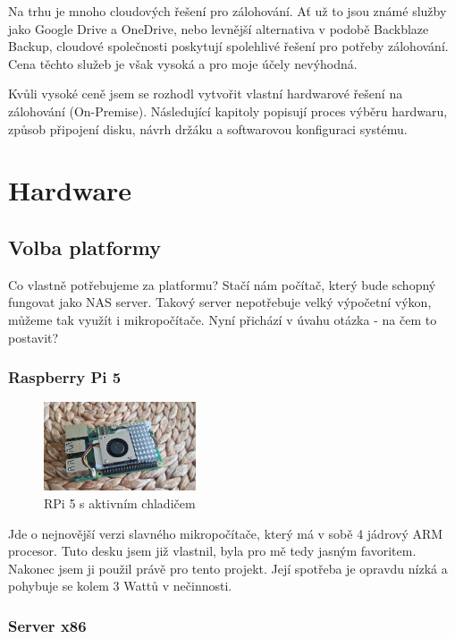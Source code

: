 \documentclass[a4paper,12pt, oneside]{book}
\begin{document}
Na trhu je mnoho cloudových řešení pro zálohování. 
Ať už to jsou známé služby jako Google Drive a OneDrive, nebo 
levnější alternativa v podobě Backblaze Backup, cloudové společnosti poskytují 
spolehlivé řešení pro potřeby zálohování. Cena těchto služeb je však vysoká a pro moje účely nevýhodná. 

Kvůli vysoké ceně jsem se rozhodl vytvořit vlastní hardwarové řešení na
zálohování (On-Premise).
Následující kapitoly popisují
proces výběru hardwaru, způsob připojení disku, návrh držáku a softwarovou
konfiguraci systému.


\chapter{Hardware}
\section{Volba platformy}

Co vlastně potřebujeme za platformu? Stačí nám počítač, který bude 
schopný fungovat jako NAS server. Takový server nepotřebuje velký
výpočetní výkon, můžeme tak využít i mikropočítače. 
Nyní přichází v úvahu otázka - na čem to postavit? 


\subsection{Raspberry Pi 5}

\begin{figure}
	\centering
	\includegraphics[width=0.4\textwidth]{img/rpi5-active-cooler-c.jpg}
	\caption{RPi 5 s aktivním chladičem}
\end{figure}
Jde o nejnovější verzi slavného mikropočítače, který má v sobě 4 jádrový ARM
procesor. Tuto desku jsem již vlastnil, byla pro mě tedy jasným favoritem.
Nakonec jsem ji použil právě pro tento projekt. Její spotřeba je opravdu nízká
a pohybuje se kolem 3 Wattů v nečinnosti.  \cite{RPi-Power}

\subsection{Server x86}
\end{document}
